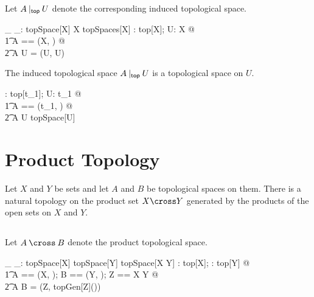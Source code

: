 \documentclass[11pt, oneside]{article}
\begin{document}
Let $A \mathbin{|_\mathsf{top}} U$ denote the corresponding induced topological space.

\begin{gendef}[X]
	\_ \inducedTopSp \_: topSpace[X] \cross \power X \fun topSpaces[X]
\where
	\forall \tau: top[X]; U: \power X @ \\
	\t1	\LET A == (X, \tau) @ \\
	\t2		A \inducedTopSp U = (U, \tau \inducedTop U)
\end{gendef}

\begin{remark}
The induced topological space $A \mathbin{|_\mathsf{top}} U$ is a topological space on $U$.

\begin{zed}
	\forall \tau: top[t_1]; U: \power t_1 @ \\
	\t1	\LET A == (t_1, \tau) @ \\
	\t2		A \inducedTopSp U \in topSpace[U]
\end{zed}

\end{remark}

\section{Product Topology}

Let $X$ and $Y$ be sets and let $A$ and $B$ be topological spaces on them.
There is a natural topology on the product set $X \cross Y$ generated by the products of the open sets on $X$ and $Y$.

\subsection{}

Let $A \prodTop B$ denote the product topological space.

\begin{gendef}[X,Y]
	\_ \prodTop \_: topSpace[X] \cross topSpace[Y] \fun topSpace[X \cross Y]
\where
	\forall \tau: top[X]; \sigma: top[Y] @ \\
	\t1	\LET A == (X, \tau); B == (Y, \sigma); Z == X \cross Y @ \\
	\t2		A \prodTop B = (Z, topGen[Z](\tau \cross \sigma))
\end{gendef}

\printbibliography
\end{document}
